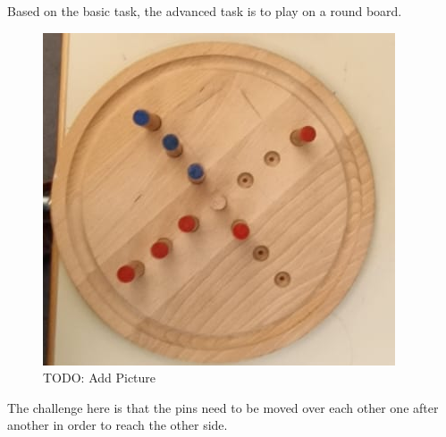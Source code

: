 Based on the basic task, the advanced task is to play on a round board.

\begin{figure}[H]
	\begin{center}
		\includegraphics[width=0.3\linewidth]{images/PegBoardRound.png}
		\caption{TODO: Add Picture}
	\end{center}
\end{figure}

The challenge here is that the pins need to be moved over each other one after another in order to reach the other side.
